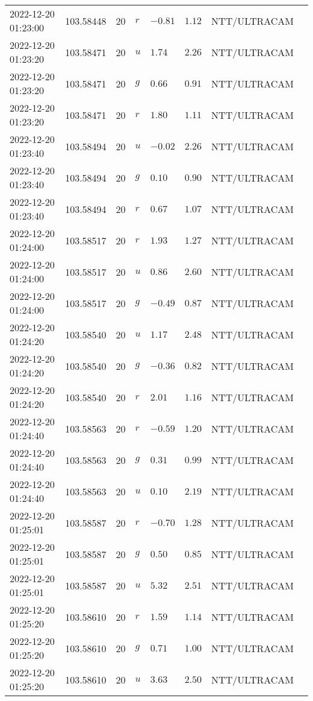 \documentclass{nature_plusfigure}
\begin{document}
\begin{supplement}
\begin{center}
\begin{longtable}{llllllll}
2022-12-20 01:23:00 & 103.58448 & 20 & $r$ & $-0.81$ & $1.12$ & NTT/ULTRACAM &  \\ 
2022-12-20 01:23:20 & 103.58471 & 20 & $u$ & $1.74$ & $2.26$ & NTT/ULTRACAM &  \\ 
2022-12-20 01:23:20 & 103.58471 & 20 & $g$ & $0.66$ & $0.91$ & NTT/ULTRACAM &  \\ 
2022-12-20 01:23:20 & 103.58471 & 20 & $r$ & $1.80$ & $1.11$ & NTT/ULTRACAM &  \\ 
2022-12-20 01:23:40 & 103.58494 & 20 & $u$ & $-0.02$ & $2.26$ & NTT/ULTRACAM &  \\ 
2022-12-20 01:23:40 & 103.58494 & 20 & $g$ & $0.10$ & $0.90$ & NTT/ULTRACAM &  \\ 
2022-12-20 01:23:40 & 103.58494 & 20 & $r$ & $0.67$ & $1.07$ & NTT/ULTRACAM &  \\ 
2022-12-20 01:24:00 & 103.58517 & 20 & $r$ & $1.93$ & $1.27$ & NTT/ULTRACAM &  \\ 
2022-12-20 01:24:00 & 103.58517 & 20 & $u$ & $0.86$ & $2.60$ & NTT/ULTRACAM &  \\ 
2022-12-20 01:24:00 & 103.58517 & 20 & $g$ & $-0.49$ & $0.87$ & NTT/ULTRACAM &  \\ 
2022-12-20 01:24:20 & 103.58540 & 20 & $u$ & $1.17$ & $2.48$ & NTT/ULTRACAM &  \\ 
2022-12-20 01:24:20 & 103.58540 & 20 & $g$ & $-0.36$ & $0.82$ & NTT/ULTRACAM &  \\ 
2022-12-20 01:24:20 & 103.58540 & 20 & $r$ & $2.01$ & $1.16$ & NTT/ULTRACAM &  \\ 
2022-12-20 01:24:40 & 103.58563 & 20 & $r$ & $-0.59$ & $1.20$ & NTT/ULTRACAM &  \\ 
2022-12-20 01:24:40 & 103.58563 & 20 & $g$ & $0.31$ & $0.99$ & NTT/ULTRACAM &  \\ 
2022-12-20 01:24:40 & 103.58563 & 20 & $u$ & $0.10$ & $2.19$ & NTT/ULTRACAM &  \\ 
2022-12-20 01:25:01 & 103.58587 & 20 & $r$ & $-0.70$ & $1.28$ & NTT/ULTRACAM &  \\ 
2022-12-20 01:25:01 & 103.58587 & 20 & $g$ & $0.50$ & $0.85$ & NTT/ULTRACAM &  \\ 
2022-12-20 01:25:01 & 103.58587 & 20 & $u$ & $5.32$ & $2.51$ & NTT/ULTRACAM &  \\ 
2022-12-20 01:25:20 & 103.58610 & 20 & $r$ & $1.59$ & $1.14$ & NTT/ULTRACAM &  \\ 
2022-12-20 01:25:20 & 103.58610 & 20 & $g$ & $0.71$ & $1.00$ & NTT/ULTRACAM &  \\ 
2022-12-20 01:25:20 & 103.58610 & 20 & $u$ & $3.63$ & $2.50$ & NTT/ULTRACAM &  \\ 

\end{longtable}
\end{center}
\end{supplement}
\end{document}
